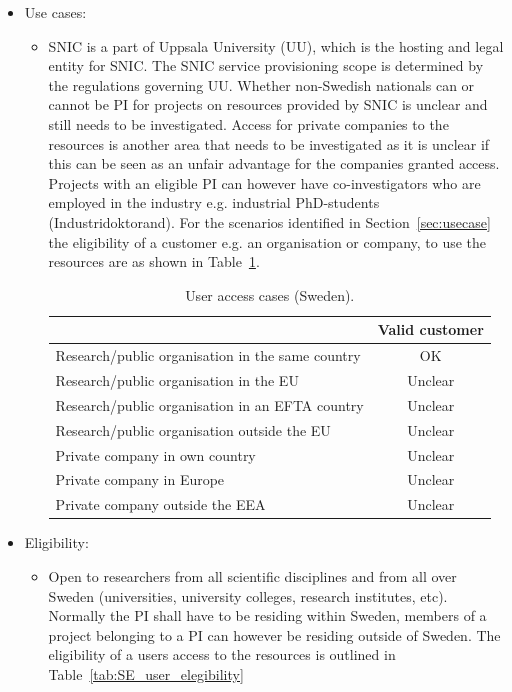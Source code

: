\documentclass{article}
\begin{document}
\begin{itemize}
\item[] Use cases:
\begin{itemize}
    \item []

SNIC is a part of Uppsala University (UU), which is the hosting and legal entity for SNIC. 
The SNIC service provisioning scope is determined by the regulations governing UU. 
Whether non-Swedish nationals can or cannot be PI for projects on resources provided by SNIC is unclear and still needs to be investigated.
Access for private companies to the resources is another area that needs to be investigated as it is unclear if this can be seen as an unfair advantage for the companies granted access. Projects with an eligible PI can however have co-investigators who are employed in the industry e.g. industrial PhD-students (Industridoktorand). 
For the scenarios identified in Section~\ref{sec:usecase} the eligibility of a customer e.g. an organisation or company, to use the resources are as shown in Table~\ref{tab:SE_use_cases}.

    \begin{table}[!h]
        \centering
        \begin{tabular}{|l|c|}
        \hline
             & Valid customer  \\
        \hline
Research/public organisation in the same country & OK \\
        \hline
Research/public organisation in the EU & Unclear \\
        \hline
Research/public organisation in an EFTA country & Unclear \\
        \hline
Research/public organisation outside the EU & Unclear \\
        \hline
Private company in own country & Unclear \\
        \hline
Private company in Europe    & Unclear \\
        \hline
Private company outside the EEA & Unclear \\
        \hline 
        \end{tabular}
        \caption{User access cases (Sweden).}
        \label{tab:SE_use_cases}
    \end{table}
\end{itemize}
\item[]Eligibility:
\begin{itemize} 
\item[] Open to researchers from all scientific disciplines and from all over Sweden (universities, university colleges, research institutes, etc). 
Normally the PI shall have to be residing within Sweden, members of a project belonging to a PI can however be residing outside of Sweden. 
The eligibility of a users access to the resources is outlined in Table~\ref{tab:SE_user_elegibility}
\begin{table}[!h]
    \centering
    \begin{tabular}{|l|c|}
        \hline
    

\end{tabular}
\end{table}
\end{itemize}
\end{itemize}
\end{document}
